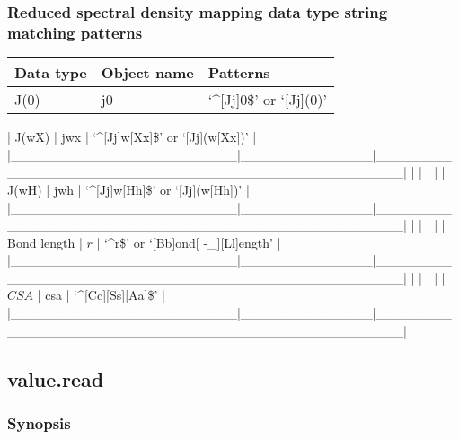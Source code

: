\subsubsection{Reduced spectral density mapping data type string matching patterns}



\begin{center}
\begin{tabular}{lll}
\toprule
Data type & Object name & Patterns \\
\midrule
 J(0)                    &  j0            &  `\^{}[Jj]0\$' or `[Jj](0)'                            \\
\bottomrule
\end{tabular}
\end{center}

| J(wX)                  | jwx          | `\^{}[Jj]w[Xx]\$' or `[Jj](w[Xx])'                   |
|\_\_\_\_\_\_\_\_\_\_\_\_\_\_\_\_\_\_\_\_\_\_\_\_|\_\_\_\_\_\_\_\_\_\_\_\_\_\_|\_\_\_\_\_\_\_\_\_\_\_\_\_\_\_\_\_\_\_\_\_\_\_\_\_\_\_\_\_\_\_\_\_\_\_\_\_\_\_\_\_\_\_\_\_\_\_\_\_\_|
|                        |              |                                                  |
| J(wH)                  | jwh          | `\^{}[Jj]w[Hh]\$' or `[Jj](w[Hh])'                   |
|\_\_\_\_\_\_\_\_\_\_\_\_\_\_\_\_\_\_\_\_\_\_\_\_|\_\_\_\_\_\_\_\_\_\_\_\_\_\_|\_\_\_\_\_\_\_\_\_\_\_\_\_\_\_\_\_\_\_\_\_\_\_\_\_\_\_\_\_\_\_\_\_\_\_\_\_\_\_\_\_\_\_\_\_\_\_\_\_\_|
|                        |              |                                                  |
| Bond length            | $r$            | `\^{}r\$' or `[Bb]ond[ -\_][Ll]ength'                 |
|\_\_\_\_\_\_\_\_\_\_\_\_\_\_\_\_\_\_\_\_\_\_\_\_|\_\_\_\_\_\_\_\_\_\_\_\_\_\_|\_\_\_\_\_\_\_\_\_\_\_\_\_\_\_\_\_\_\_\_\_\_\_\_\_\_\_\_\_\_\_\_\_\_\_\_\_\_\_\_\_\_\_\_\_\_\_\_\_\_|
|                        |              |                                                  |
| $CSA$                    | csa          | `\^{}[Cc][Ss][Aa]\$'                                 |
|\_\_\_\_\_\_\_\_\_\_\_\_\_\_\_\_\_\_\_\_\_\_\_\_|\_\_\_\_\_\_\_\_\_\_\_\_\_\_|\_\_\_\_\_\_\_\_\_\_\_\_\_\_\_\_\_\_\_\_\_\_\_\_\_\_\_\_\_\_\_\_\_\_\_\_\_\_\_\_\_\_\_\_\_\_\_\_\_\_|


\newpage

\subsection{value.read}


\subsubsection{Synopsis}


